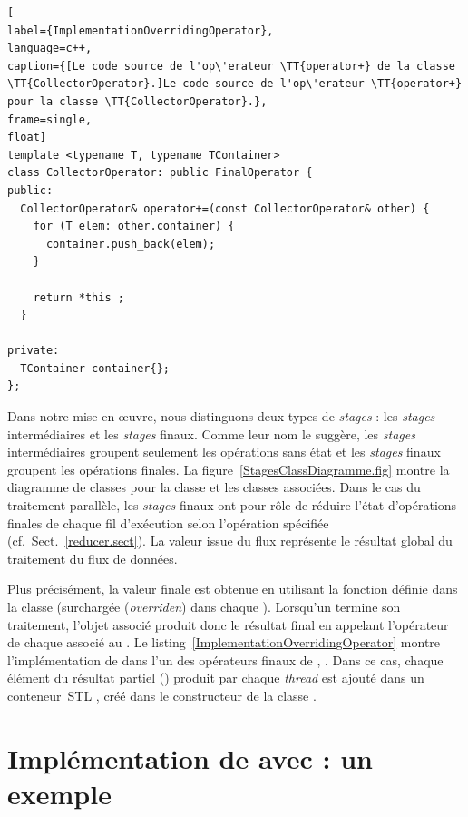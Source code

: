\begin{lstlisting}[
label={ImplementationOverridingOperator},
language=c++,
caption={[Le code source de l'op\'erateur \TT{operator+} de la classe \TT{CollectorOperator}.]Le code source de l'op\'erateur \TT{operator+} pour la classe \TT{CollectorOperator}.},
frame=single,
float]
template <typename T, typename TContainer>
class CollectorOperator: public FinalOperator {
public:
  CollectorOperator& operator+=(const CollectorOperator& other) {
    for (T elem: other.container) {
      container.push_back(elem);
    }

    return *this ;
  }	
  
private:
  TContainer container{};
};
\end{lstlisting}


\label{stages-finaux.sect}
%
Dans notre mise en \oe{}uvre, nous distinguons deux types de \emph{stages} : les \emph{stages} interm\'ediaires et les \emph{stages} finaux. Comme leur nom le sugg\`ere, les \emph{stages} interm\'ediaires groupent seulement les op\'erations sans \'etat et les \emph{stages} finaux groupent les op\'erations finales. La figure~\ref{StagesClassDiagramme.fig} montre la diagramme de classes pour la classe  et les classes associ\'ees. Dans le cas du traitement parall\`ele, les \emph{stages} finaux ont pour r\^ole de r\'eduire l'\'etat d'op\'erations finales de chaque fil d'ex\'ecution selon l'op\'eration sp\'ecifi\'ee (cf.~Sect.~\ref{reducer.sect}). La valeur issue du flux repr\'esente le r\'esultat global du traitement du flux de donn\'ees.

Plus pr\'ecis\'ement, la valeur finale est obtenue en utilisant la
fonction  d\'efinie dans la classe 
(surcharg\'ee (\emph{overriden}) dans chaque ).
%
Lorsqu'un  termine son traitement, l'objet 
associ\'e produit donc le r\'esultat final en appelant l'op\'erateur
 de chaque  associ\'e au . Le
listing~\ref{ImplementationOverridingOperator} montre
l'impl\'ementation de  dans l'un des op\'erateurs
finaux de , . Dans ce cas, chaque
\'el\'ement du r\'esultat partiel () produit par
chaque \emph{thread} est ajout\'e dans un conteneur~STL
, cr\'e\'e dans le constructeur de la classe .




\section{Impl\'ementation de  avec  : un exemple}

